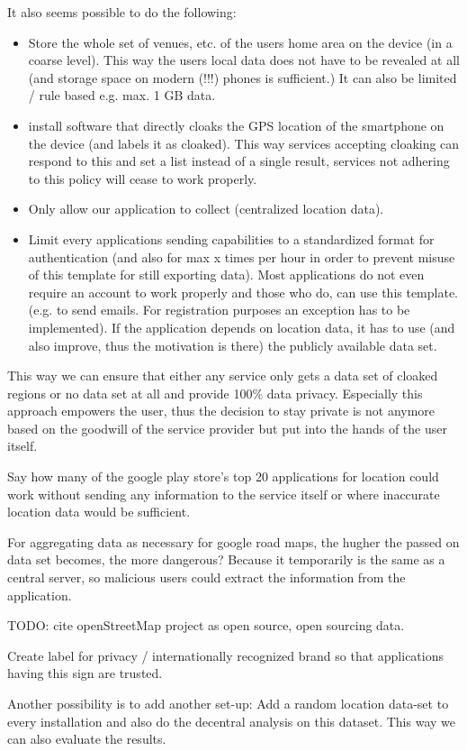 It also seems possible to do the following: 
\begin{itemize}
	\item Store the whole set of venues, etc. of the users home area on the device (in a coarse level). This way the users local data does not have to be revealed at all (and storage space on modern (!!!) phones is sufficient.) It can also be limited / rule based e.g. max. 1 GB data.
	\item install software that directly cloaks the GPS location of the smartphone on the device (and labels it as cloaked). This way services accepting cloaking can respond to this and set a list instead of a single result, services not adhering to this policy will cease to work properly.
	\item Only allow our application to collect (centralized location data).
	\item Limit every applications sending capabilities to a standardized format for authentication (and also for max x times per hour in order to prevent misuse of this template for still exporting data). Most applications do not even require an account to work properly and those who do, can use this template. (e.g. to send emails. For registration purposes an exception has to be implemented). If the application depends on location data, it has to use (and also improve, thus the motivation is there) the publicly available data set.
\end{itemize}
This way we can ensure that either any service only gets a data set of cloaked regions or no data set at all and provide 100\% data privacy. Especially this approach empowers the user, thus the decision to stay private is not anymore based on the goodwill of the service provider but put into the hands of the user itself.

Say how many of the google play store's top 20 applications for location could work without sending any information to the service itself or where inaccurate location data would be sufficient.

For aggregating data as necessary for google road maps, the hugher the passed on data set becomes, the more dangerous? Because it temporarily is  the same as a central server, so malicious users could extract the information from the application.


TODO: cite openStreetMap project as open source, open sourcing data.

Create label for privacy / internationally recognized brand so that applications having this sign are trusted.

Another possibility is to add another set-up: Add a random location data-set to every installation and also do the decentral analysis on this dataset. This way we can also evaluate the results.